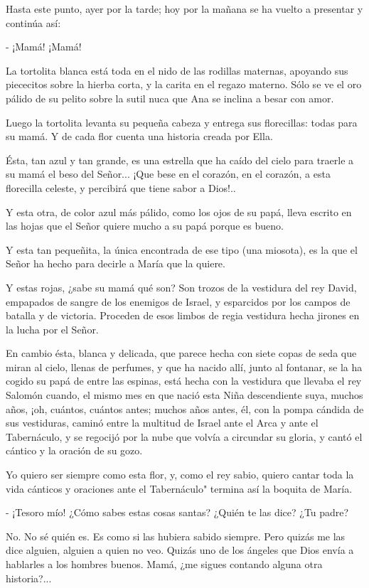 \documentclass[12pt, twoside, openright]{book} %
\begin{document}
Hasta este punto, ayer por la tarde; hoy por la mañana se ha vuelto a presentar y continúa así: 

- ¡Mamá! ¡Mamá! 

La tortolita blanca está toda en el nido de las rodillas maternas, apoyando sus piececitos sobre la hierba corta, y la carita en el regazo materno. Sólo se ve el oro pálido de su pelito sobre la sutil nuca que Ana se inclina a besar con amor. 

Luego la tortolita levanta su pequeña cabeza y entrega sus florecillas: todas para su mamá. Y de cada flor cuenta una historia creada por Ella. 

Ésta, tan azul y tan grande, es una estrella que ha caído del cielo para traerle a su mamá el beso del Señor... ¡Que bese en el corazón, en el corazón, a esta florecilla celeste, y percibirá que tiene sabor a Dios!.. 

Y esta otra, de color azul más pálido, como los ojos de su papá, lleva escrito en las hojas que el Señor quiere mucho a su papá porque es bueno. 

Y esta tan pequeñita, la única encontrada de ese tipo (una miosota), es la que el Señor ha hecho para decirle a María que la quiere. 

Y estas rojas, ¿sabe su mamá qué son? Son trozos de la vestidura del rey David, empapados de sangre de los enemigos de Israel, y esparcidos por los campos de batalla y de victoria. Proceden de esos limbos de regia vestidura hecha jirones en la lucha por el Señor. 

En cambio ésta, blanca y delicada, que parece hecha con siete copas de seda que miran al cielo, llenas de perfumes, y que ha nacido allí, junto al fontanar, se la ha cogido su papá de entre las espinas, está hecha con la vestidura que llevaba el rey Salomón cuando, el mismo mes en que nació esta Niña descendiente suya, muchos años, ¡oh, cuántos, cuántos antes; muchos años antes, él, con la pompa cándida de sus vestiduras, caminó entre la multitud de Israel ante el Arca y ante el Tabernáculo, y se regocijó por la nube que volvía a circundar su gloria, y cantó el cántico y la oración de su gozo. 

Yo quiero ser siempre como esta flor, y, como el rey sabio, quiero cantar toda la vida cánticos y oraciones ante el Tabernáculo" termina así la boquita de María. 

- ¡Tesoro mío! ¿Cómo sabes estas cosas santas? ¿Quién te las dice? ¿Tu padre? 

No. No sé quién es. Es como si las hubiera sabido siempre. Pero quizás me las dice alguien, alguien a quien no veo. Quizás uno de los ángeles que Dios envía a hablarles a los hombres buenos. Mamá, ¿me sigues contando alguna otra historia?... 
\end{document}
